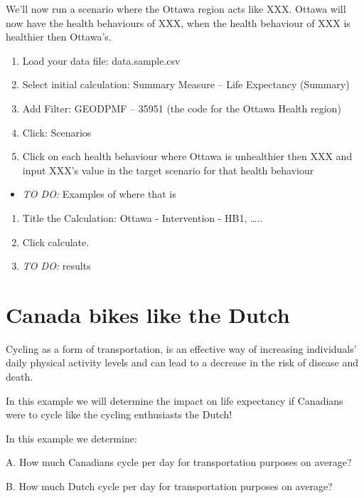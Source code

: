 \documentclass[]{book}
\providecommand{\tightlist}{%
  \setlength{\itemsep}{0pt}\setlength{\parskip}{0pt}}
\begin{document}
We'll now run a scenario where the Ottawa region acts like XXX. Ottawa
will now have the health behaviours of XXX, when the health behaviour of
XXX is healthier then Ottawa's.

\begin{enumerate}
\def\labelenumi{\arabic{enumi}.}
\item
  Load your data file: data.sample.csv
\item
  Select initial calculation: Summary Measure -- Life Expectancy
  (Summary)
\item
  Add Filter: GEODPMF -- 35951 (the code for the Ottawa Health region)
\item
  Click: Scenarios
\item
  Click on each health behaviour where Ottawa is unhealthier then XXX
  and input XXX's value in the target scenario for that health behaviour
\end{enumerate}

\begin{itemize}
\tightlist
\item
  \emph{TO DO: } Examples of where that is
\end{itemize}

\begin{enumerate}
\def\labelenumi{\arabic{enumi}.}
\setcounter{enumi}{5}
\item
  Title the Calculation: Ottawa - Intervention - HB1, \ldots{}..
\item
  Click calculate.
\item
  \emph{TO DO:} results
\end{enumerate}

\section{Canada bikes like the Dutch}\label{canada-bikes-like-the-dutch}

Cycling as a form of transportation, is an effective way of increasing
individuals' daily physical activity levels and can lead to a decrease
in the risk of disease and death.

In this example we will determine the impact on life expectancy if
Canadians were to cycle like the cycling enthusiasts the Dutch!

In this example we determine:

A. How much Canadians cycle per day for transportation purposes on
average?

B. How much Dutch cycle per day for transportation purposes on average?
\end{document}
